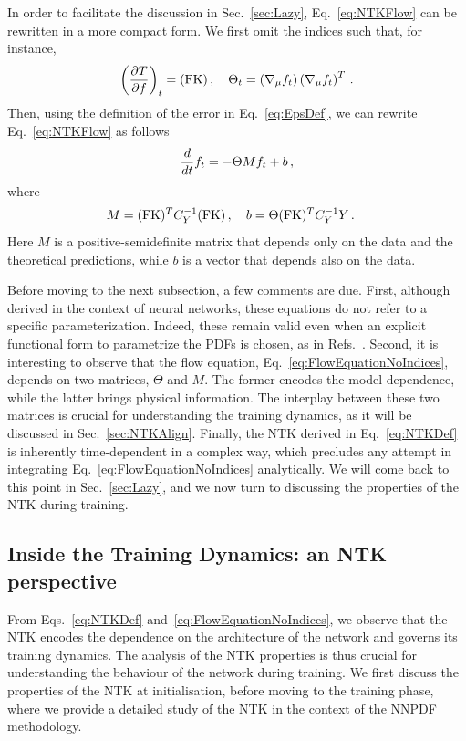 In order to facilitate the discussion in Sec.~\ref{sec:Lazy},
Eq.~\eqref{eq:NTKFlow} can be rewritten in a more compact form. We first omit
the indices such that, for instance,
\begin{align}
  \left(\frac{\partial T}{\partial f}\right)_t = (\mathrm{FK})\, , \quad
  \Theta_t = \left(\nabla_\mu f_t\right) \left(\nabla_\mu f_t\right)^T\, .
  \label{eq:dTdfForLinearObs}
\end{align}
Then, using the definition of the error in Eq.~\eqref{eq:EpsDef}, we can rewrite
Eq.~\eqref{eq:NTKFlow} as follows
\begin{align}
    \label{eq:FlowEquationNoIndices}
    \frac{d}{dt} f_t = -\Theta M f_t + b\, ,
\end{align}
where
\begin{align}
    M &= (\mathrm{FK})^T C_Y^{-1} (\mathrm{FK})\, , \quad b = \Theta (\mathrm{FK})^T C_Y^{-1} Y\, .
\end{align}
Here $M$ is a positive-semidefinite matrix that depends only on the data and the
theoretical predictions, while $b$ is a vector that depends also on the data.

Before moving to the next subsection, a few comments are due. First, although
derived in the context of neural networks, these equations do not refer to a
specific parameterization. Indeed, these remain valid even when an explicit
functional form to parametrize the PDFs is chosen, as \eg in
Refs.~\cite{Bailey:2020ooq,Hou:2019efy,Costantini:2025wxp}. Second, it is
interesting to observe that the flow equation,
Eq.~\eqref{eq:FlowEquationNoIndices}, depends on two matrices, $\Theta$ and $M$.
The former encodes the model dependence, while the latter brings physical
information. The interplay between these two matrices is crucial for
understanding the training dynamics, as it will be discussed in
Sec.~\ref{sec:NTKAlign}. Finally, the NTK derived in Eq.~\ref{eq:NTKDef} is
inherently time-dependent in a complex way, which precludes any attempt in
integrating Eq.~\ref{eq:FlowEquationNoIndices} analytically. We will come back
to this point in Sec.~\ref{sec:Lazy}, and we now turn to discussing the
properties of the NTK during training.

\subsection{Inside the Training Dynamics: an NTK perspective}

From Eqs.~\eqref{eq:NTKDef} and~\eqref{eq:FlowEquationNoIndices}, we observe
that the NTK encodes the dependence on the architecture of the network and
governs its training dynamics. The analysis of the NTK properties is thus
crucial for understanding the behaviour of the network during training. We first
discuss the properties of the NTK at initialisation, before moving to the
training phase, where we provide a detailed study of the NTK in the context of
the NNPDF methodology.

